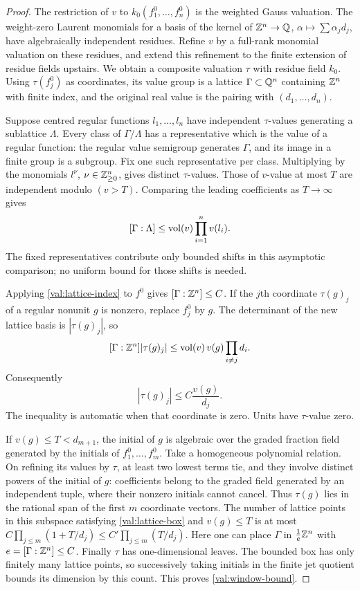 \begin{proof}
The restriction of $v$ to $k_0(f_1^0,\ldots,f_n^0)$ is the weighted
Gauss valuation. The weight-zero Laurent monomials for a basis of the
kernel of $\mathbb Z^n\to\mathbb Q$, $\alpha\mapsto\sum\alpha_jd_j$, have
algebraically independent residues. Refine $v$ by a full-rank monomial
valuation on these residues, and extend this refinement to the finite
extension of residue fields upstairs. We obtain a composite valuation
$\tau$ with residue field $k_0$. Using $\tau(f_j^0)$ as coordinates,
its value group is a lattice $\Gamma\subset\mathbb Q^n$ containing $\mathbb Z^n$
with finite index, and the original real value is the pairing with
$(d_1,\ldots,d_n)$.

Suppose centred regular functions $l_1,\ldots,l_n$ have independent
$\tau$-values generating a sublattice $\Lambda$. Every class of
$\Gamma/\Lambda$ has a representative which is the value of a regular
function: the regular value semigroup generates $\Gamma$, and its image
in a finite group is a subgroup. Fix one such representative per class.
Multiplying by the monomials $l^\nu$, $\nu\in\mathbb Z_{\ge0}^n$, gives
distinct $\tau$-values. Those of $v$-value at most $T$ are independent
modulo $(v>T)$. Comparing the leading coefficients as $T\to\infty$
gives
\begin{equation}\label{val:lattice-index}
 [\Gamma:\Lambda]\le \operatorname{vol}(v)\prod_{i=1}^n v(l_i).
\end{equation}
The fixed representatives contribute only bounded shifts in this
asymptotic comparison; no uniform bound for those shifts is needed.

Applying \eqref{val:lattice-index} to $f^0$ gives
$[\Gamma:\mathbb Z^n]\le C$. If the $j$th coordinate $\tau(g)_j$ of a
regular nonunit $g$ is nonzero, replace $f_j^0$ by $g$. The determinant
of the new lattice basis is $|\tau(g)_j|$, so
\[
 [\Gamma:\mathbb Z^n]|\tau(g)_j|
 \le \operatorname{vol}(v)\,v(g)\prod_{i\ne j}d_i.
\]
Consequently
\begin{equation}\label{val:lattice-box}
 |\tau(g)_j|\le C\frac{v(g)}{d_j}.
\end{equation}
The inequality is automatic when that coordinate is zero. Units have
$\tau$-value zero.

If $v(g)\le T<d_{m+1}$, the initial of $g$ is algebraic over the
graded fraction field generated by the initials of
$f_1^0,\ldots,f_m^0$. Take a homogeneous polynomial relation. On
refining its values by $\tau$, at least two lowest terms tie, and they
involve distinct powers of the initial of $g$: coefficients belong to
the graded field generated by an independent tuple, where their
nonzero initials cannot cancel. Thus $\tau(g)$ lies in the rational
span of the first $m$ coordinate vectors. The number of lattice points
in this subspace satisfying \eqref{val:lattice-box} and $v(g)\le T$
is at most
$C\prod_{j\le m}(1+T/d_j)\le C'\prod_{j\le m}(T/d_j)$.
Here one can place $\Gamma$ in
$\frac1e\mathbb Z^n$ with $e=[\Gamma:\mathbb Z^n]\le C$.
Finally $\tau$ has one-dimensional leaves. The bounded box has only
finitely many lattice points, so successively taking initials in the
finite jet quotient bounds its dimension by this count. This proves
\eqref{val:window-bound}.
\end{proof}

